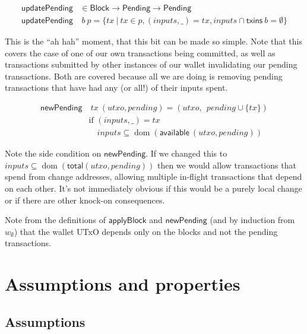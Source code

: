 \documentclass{article}
\DeclareMathOperator{\dom}{dom}
\begin{document}
\begin{equation}
\begin{split}
\mathsf{updatePending} & \in \mathsf{Block} \to \mathsf{Pending} \to \mathsf{Pending} \\
\mathsf{updatePending} & ~ b ~ p = \{ tx ~|~ tx \in p, (inputs, \_) = tx, inputs \cap \mathsf{txins} ~ b = \emptyset \}
\end{split}
\end{equation}

This is the ``ah hah'' moment, that this bit can be made so simple. Note that
this covers the case of one of our own transactions being committed, as well as
transactions submitted by other instances of our wallet invalidating our
pending transactions. Both are covered because all we are doing is removing
pending transactions that have had any (or all!) of their inputs spent.

\begin{equation}
\begin{split}
\mathsf{newPending} & ~ tx ~ (utxo, pending) = ( utxo, ~~ pending \cup \{ tx \} ) \\
                    & \text{if } (inputs, \_) = tx \\
                    & \quad inputs \subseteq \dom (\mathsf{available} ~ (utxo, pending))
\end{split}
\end{equation}

Note the side condition on $\mathsf{newPending}$. If we changed this to
$inputs \subseteq \dom (\mathsf{total}(utxo, pending))$ then we would allow transactions
that spend from change addresses, allowing multiple in-flight transactions
that depend on each other. It's not immediately obvious if this would be a
purely local change or if there are other knock-on consequences.

Note from the definitions of $\mathsf{applyBlock}$ and $\mathsf{newPending}$
(and by induction from $w_\emptyset$) that the wallet UTxO depends only on the
blocks and not the pending transactions.



\section{Assumptions and properties}

\subsection{Assumptions}
\end{document}
